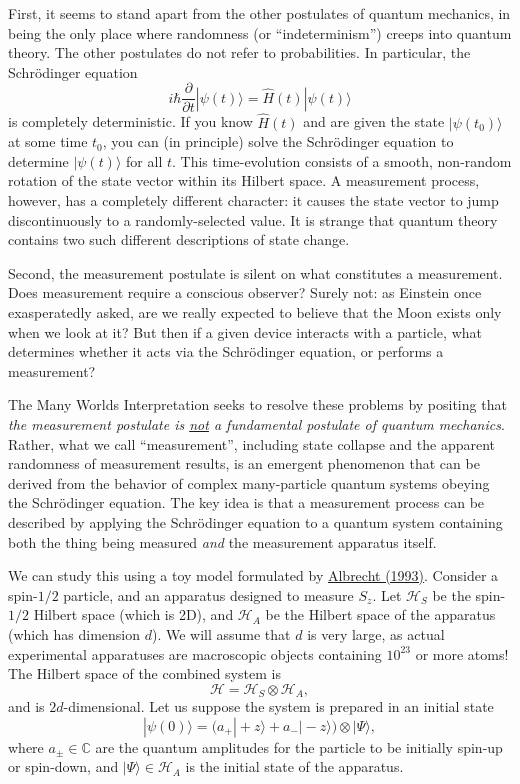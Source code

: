\documentclass[pra,12pt]{revtex4}
\begin{document}
First, it seems to stand apart from the other postulates of quantum
mechanics, in being the only place where randomness (or
``indeterminism'') creeps into quantum theory.  The other postulates
do not refer to probabilities.  In particular, the Schr\"odinger equation
$$i\hbar\frac{\partial}{\partial t}|\psi(t)\rangle = \hat{H}(t) |\psi(t)\rangle$$
is completely deterministic.  If you know $\hat{H}(t)$ and are given
the state $|\psi(t_0)\rangle$ at some time $t_0$, you can (in
principle) solve the Schr\"odinger equation to determine
$|\psi(t)\rangle$ for all $t$.  This time-evolution consists of a
smooth, non-random rotation of the state vector within its Hilbert
space.  A measurement process, however, has a completely different
character: it causes the state vector to jump discontinuously to a
randomly-selected value.  It is strange that quantum theory contains
two such different descriptions of state change.

Second, the measurement postulate is silent on what constitutes a
measurement.  Does measurement require a conscious observer?  Surely
not: as Einstein once exasperatedly asked, are we really expected to
believe that the Moon exists only when we look at it?  But then if a
given device interacts with a particle, what determines whether it
acts via the Schr\"odinger equation, or performs a measurement?

The Many Worlds Interpretation seeks to resolve these problems by
positing that \textit{the measurement postulate is \underline{not} a
  fundamental postulate of quantum mechanics}.  Rather, what we call
``measurement'', including state collapse and the apparent randomness
of measurement results, is an emergent phenomenon that can be derived
from the behavior of complex many-particle quantum systems obeying the
Schr\"odinger equation.  The key idea is that a measurement process
can be described by applying the Schr\"odinger equation to a quantum
system containing both the thing being measured \textit{and} the
measurement apparatus itself.

We can study this using a toy model formulated by
\hyperref[cite:albrecht]{Albrecht (1993)}.  Consider a spin-$1/2$
particle, and an apparatus designed to measure $S_z$.  Let
$\mathscr{H}_S$ be the spin-$1/2$ Hilbert space (which is 2D), and
$\mathscr{H}_A$ be the Hilbert space of the apparatus (which has
dimension $d$).  We will assume that $d$ is very large, as actual
experimental apparatuses are macroscopic objects containing $10^{23}$
or more atoms!  The Hilbert space of the combined system is
$$\mathscr{H} = \mathscr{H}_S \otimes \mathscr{H}_A,$$
and is $2d$-dimensional.  Let us suppose the system is prepared in an initial
state
$$|\psi(0)\rangle = \Big(a_+ |\!+z\rangle + a_- |\!-z\rangle\Big) \otimes |\Psi\rangle,$$
where $a_\pm\in\mathbb{C}$ are the quantum amplitudes for the particle
to be initially spin-up or spin-down, and $|\Psi\rangle \in
\mathscr{H}_A$ is the initial state of the apparatus.
\end{document}
